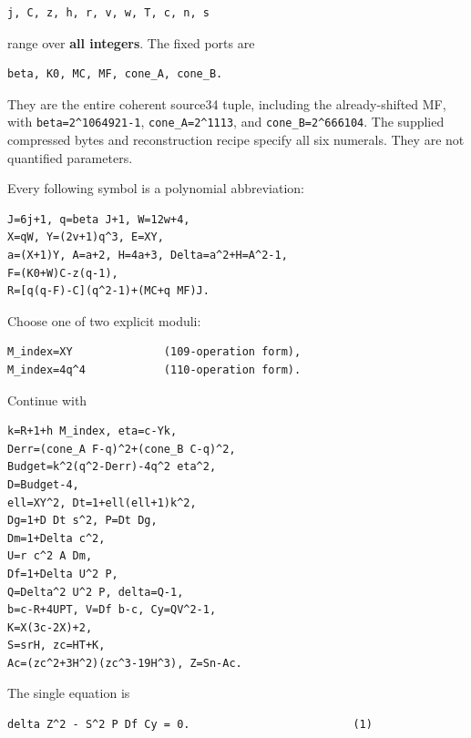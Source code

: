 \begin{verbatim}
j, C, z, h, r, v, w, T, c, n, s
\end{verbatim}

range over \textbf{all integers}. The fixed ports are



\begin{verbatim}
beta, K0, MC, MF, cone_A, cone_B.
\end{verbatim}

They are the entire coherent source34 tuple, including the already-shifted MF, with \texttt{beta=\allowbreak{}2\textasciicircum{}\allowbreak{}1064921-1}, \texttt{cone\_\allowbreak{}A=\allowbreak{}2\textasciicircum{}\allowbreak{}1113}, and \texttt{cone\_\allowbreak{}B=\allowbreak{}2\textasciicircum{}\allowbreak{}666104}. The supplied compressed bytes and reconstruction recipe specify all six numerals. They are not quantified parameters.



Every following symbol is a polynomial abbreviation:



\begin{verbatim}
J=6j+1, q=beta J+1, W=12w+4,
X=qW, Y=(2v+1)q^3, E=XY,
a=(X+1)Y, A=a+2, H=4a+3, Delta=a^2+H=A^2-1,
F=(K0+W)C-z(q-1),
R=[q(q-F)-C](q^2-1)+(MC+q MF)J.
\end{verbatim}

Choose one of two explicit moduli:



\begin{verbatim}
M_index=XY              (109-operation form),
M_index=4q^4            (110-operation form).
\end{verbatim}

Continue with



\begin{verbatim}
k=R+1+h M_index, eta=c-Yk,
Derr=(cone_A F-q)^2+(cone_B C-q)^2,
Budget=k^2(q^2-Derr)-4q^2 eta^2,
D=Budget-4,
ell=XY^2, Dt=1+ell(ell+1)k^2,
Dg=1+D Dt s^2, P=Dt Dg,
Dm=1+Delta c^2,
U=r c^2 A Dm,
Df=1+Delta U^2 P,
Q=Delta^2 U^2 P, delta=Q-1,
b=c-R+4UPT, V=Df b-c, Cy=QV^2-1,
K=X(3c-2X)+2,
S=srH, zc=HT+K,
Ac=(zc^2+3H^2)(zc^3-19H^3), Z=Sn-Ac.
\end{verbatim}

The single equation is



\begin{verbatim}
delta Z^2 - S^2 P Df Cy = 0.                         (1)
\end{verbatim}

